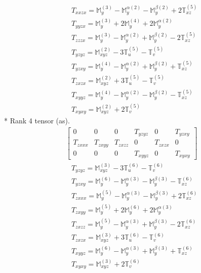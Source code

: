 \documentclass[fleqn,8pt,landscape]{jsarticle}
\begin{document}
\begin{align*}
& T_{xxzx} = \mathbb{M}_{y}^{(3)} - \mathbb{M}_{y}^{\alpha(2)} - \mathbb{M}_{y}^{\beta(2)} + 2 \mathbb{T}_{xz}^{(5)} \\
& T_{yyzx} = \mathbb{M}_{y}^{(3)} + 2 \mathbb{M}_{y}^{(4)} + 2 \mathbb{M}_{y}^{\alpha(2)} \\
& T_{zzzx} = \mathbb{M}_{y}^{(3)} - \mathbb{M}_{y}^{\alpha(2)} + \mathbb{M}_{y}^{\beta(2)} - 2 \mathbb{T}_{xz}^{(5)} \\
& T_{yzyz} = \mathbb{M}_{xyz}^{(2)} - 3 \mathbb{T}_{u}^{(5)} - \mathbb{T}_{v}^{(5)} \\
& T_{yzxy} = \mathbb{M}_{y}^{(4)} - \mathbb{M}_{y}^{\alpha(2)} + \mathbb{M}_{y}^{\beta(2)} + \mathbb{T}_{xz}^{(5)} \\
& T_{zxzx} = \mathbb{M}_{xyz}^{(2)} + 3 \mathbb{T}_{u}^{(5)} - \mathbb{T}_{v}^{(5)} \\
& T_{xyyz} = \mathbb{M}_{y}^{(4)} - \mathbb{M}_{y}^{\alpha(2)} - \mathbb{M}_{y}^{\beta(2)} - \mathbb{T}_{xz}^{(5)} \\
& T_{xyxy} = \mathbb{M}_{xyz}^{(2)} + 2 \mathbb{T}_{v}^{(5)}
\end{align*}
* Rank 4 tensor (as).
\begin{align*}
\begin{bmatrix} 0 & 0 & 0 & T_{yzyz} & 0 & T_{yzxy} \\ T_{zxxx} & T_{zxyy} & T_{zxzz} & 0 & T_{zxzx} & 0 \\ 0 & 0 & 0 & T_{xyyz} & 0 & T_{xyxy} \end{bmatrix}
\end{align*}
\begin{align*}
& T_{yzyz} = \mathbb{M}_{xyz}^{(3)} - 3 \mathbb{T}_{u}^{(6)} - \mathbb{T}_{v}^{(6)} \\
& T_{yzxy} = \mathbb{M}_{y}^{(6)} - \mathbb{M}_{y}^{\alpha(3)} - \mathbb{M}_{y}^{\beta(3)} - \mathbb{T}_{xz}^{(6)} \\
& T_{zxxx} = \mathbb{M}_{y}^{(5)} - \mathbb{M}_{y}^{\alpha(3)} - \mathbb{M}_{y}^{\beta(3)} + 2 \mathbb{T}_{xz}^{(6)} \\
& T_{zxyy} = \mathbb{M}_{y}^{(5)} + 2 \mathbb{M}_{y}^{(6)} + 2 \mathbb{M}_{y}^{\alpha(3)} \\
& T_{zxzz} = \mathbb{M}_{y}^{(5)} - \mathbb{M}_{y}^{\alpha(3)} + \mathbb{M}_{y}^{\beta(3)} - 2 \mathbb{T}_{xz}^{(6)} \\
& T_{zxzx} = \mathbb{M}_{xyz}^{(3)} + 3 \mathbb{T}_{u}^{(6)} - \mathbb{T}_{v}^{(6)} \\
& T_{xyyz} = \mathbb{M}_{y}^{(6)} - \mathbb{M}_{y}^{\alpha(3)} + \mathbb{M}_{y}^{\beta(3)} + \mathbb{T}_{xz}^{(6)} \\
& T_{xyxy} = \mathbb{M}_{xyz}^{(3)} + 2 \mathbb{T}_{v}^{(6)}
\end{align*}
\end{document}

